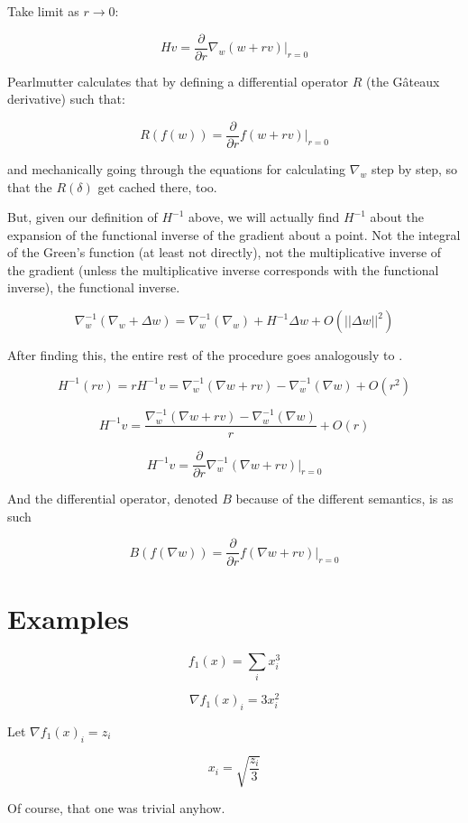 \documentclass{article}
\begin{document}
Take limit as $r \rightarrow 0$:

$$Hv = \frac{\partial}{\partial r} \nabla_w (w + rv) |_{r=0}$$

Pearlmutter calculates that by defining a differential operator $R$ (the G\^{a}teaux derivative\cite{gateaux1913}) such that:

$$R(f(w)) = \frac{\partial}{\partial r} f(w + rv)|_{r=0}$$

and mechanically going through the equations for calculating $\nabla_w$ step by step, so that the $R(\delta)$ get cached there, too.

But, given our definition of $H^{-1}$ above, we will actually find $H^{-1}$ about the expansion of the functional inverse of the gradient about a point. Not the integral of the Green's function (at least not directly), not the multiplicative inverse of the gradient (unless the multiplicative inverse corresponds with the functional inverse), the functional inverse.

$$\nabla_w^{-1} (\nabla_w + \Delta w) = \nabla_w^{-1} (\nabla_w) + H^{-1} \Delta w + O(||\Delta w||^2)$$

After finding this, the entire rest of the procedure goes analogously to \cite{pearlmutter1994}.

$$H^{-1}(rv) = rH^{-1}v = \nabla_w^{-1}(\nabla w + rv) - \nabla_w^{-1}(\nabla w) + O(r^2)$$

$$H^{-1}v = \frac{\nabla_w^{-1}(\nabla w + rv) - \nabla_w^{-1}(\nabla w)}{r} + O(r)$$

$$H^{-1}v = \frac{\partial}{\partial r} \nabla_w^{-1} (\nabla w + rv) |_{r=0}$$

And the differential operator, denoted $B$ because of the different semantics, is as such

$$B(f(\nabla w)) = \frac{\partial}{\partial r} f(\nabla w + rv)|_{r=0}$$

\section{Examples}

$$ f_1(x) = \sum_i x_i^3 $$

$$ \nabla f_1(x)_i = 3 x_i^2 $$


Let $ \nabla f_1(x)_i = z_i$

$$ x_i = \sqrt{\frac{z_i}{3}} $$


Of course, that one was trivial anyhow.
\end{document}
